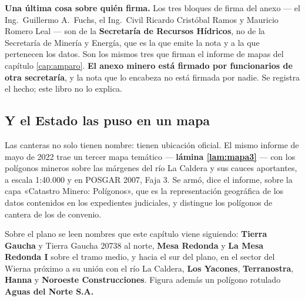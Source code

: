 \textbf{Una última cosa sobre quién firma.} Los tres bloques de firma del anexo --- el Ing.\
Guillermo A.\ Fuchs, el Ing.\ Civil Ricardo Cristóbal Ramos y Mauricio Romero Leal --- son de
la \textbf{Secretaría de Recursos Hídricos}, no de la Secretaría de Minería y Energía, que es
la que emite la nota y a la que pertenecen los datos. Son los mismos tres que firman el informe
de mapas del capítulo \ref{cap:amparo}. \textbf{El anexo minero está firmado por funcionarios de otra
secretaría}, y la nota que lo encabeza no está firmada por nadie. Se registra el hecho; este
libro no lo explica.

\subsection*{Y el Estado las puso en un mapa}

Las canteras no solo tienen nombre: tienen ubicación oficial. El mismo informe de mayo de 2022
trae un tercer mapa temático --- \textbf{lámina \ref{lam:mapa3}} --- con los polígonos mineros
sobre las márgenes del río La Caldera y sus cauces aportantes, a escala 1:40.000 y en POSGAR
2007, Faja 3. Se armó, dice el informe, sobre la capa «Catastro Minero: Polígonos», que es la
representación geográfica de los datos contenidos en los expedientes judiciales, y distingue
los polígonos de cantera de los de convenio.

Sobre el plano se leen nombres que este capítulo viene siguiendo: \textbf{Tierra Gaucha} y
Tierra Gaucha 20738 al norte, \textbf{Mesa Redonda} y \textbf{La Mesa Redonda I} sobre el
tramo medio, y hacia el sur del plano, en el sector del Wierna próximo a su unión con el río La Caldera, \textbf{Los Yacones}, \textbf{Terranostra},
\textbf{Hanna} y \textbf{Noroeste Construcciones}. Figura además un polígono rotulado
\textbf{Aguas del Norte S.A.}

